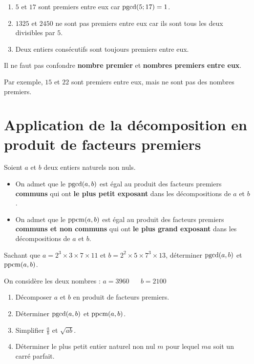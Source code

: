 \documentclass[10pt, a4paper]{article}
\begin{document}
\begin{Exemple}[][5 min]
\begin{enumerate}[leftmargin=*,itemsep=0.5pt]
    \item $5$ et $17$ sont premiers entre eux car $\operatorname{pgcd}(5; 17) = 1$.
    \item $1325$ et $2450$ ne sont pas premiers entre eux car ils sont tous les deux divisibles par $5$.
    \item Deux entiers consécutifs sont toujours premiers entre eux.
\end{enumerate}
\end{Exemple}


\begin{Remarque}
Il ne faut pas confondre \textbf{nombre premier} et \textbf{nombres premiers entre eux}.

Par exemple, $15$ et $22$ sont premiers entre eux, mais ne sont pas des nombres premiers.
\end{Remarque}


\section{Application de la décomposition en produit de facteurs premiers }

\begin{Propriete}[]
Soient $a$ et $b$ deux entiers naturels non nuls.
\begin{itemize}[leftmargin=*,itemsep=0.5pt]
  \item On admet que le $\operatorname{pgcd}(a,b)$ est égal au produit des facteurs premiers \textbf{communs} qui ont \textbf{le plus petit exposant} dans les décompositions de $a$ et $b$.
  \item On admet que le $\operatorname{ppcm}(a,b)$ est égal au produit des facteurs premiers \textbf{communs et non communs} qui ont \textbf{le plus grand exposant} dans les décompositions de $a$ et $b$.
\end{itemize}
\end{Propriete}

\begin{Exemple}[][5 min]
Sachant que $a = 2^3 \times 3 \times 7 \times 11$ et $b = 2^2 \times 5 \times 7^3 \times 13$, déterminer $\operatorname{pgcd}(a,b)$ et $\operatorname{ppcm}(a,b)$.
\end{Exemple}

\begin{Application}[][20 min]
On considère les deux nombres : $a = 3960$ ~~ $b = 2100$
\begin{enumerate}[leftmargin=*,itemsep=0.5pt]
    \item Décomposer $a$ et $b$ en produit de facteurs premiers.
    \item Déterminer $\operatorname{pgcd}(a,b)$ et $\operatorname{ppcm}(a,b)$.
    \item Simplifier $\frac{a}{b}$ et $\sqrt{ab}$.
    \item Déterminer le plus petit entier naturel non nul $m$ pour lequel $ma$ soit un carré parfait.
\end{enumerate}
\end{Application}
\end{document}
